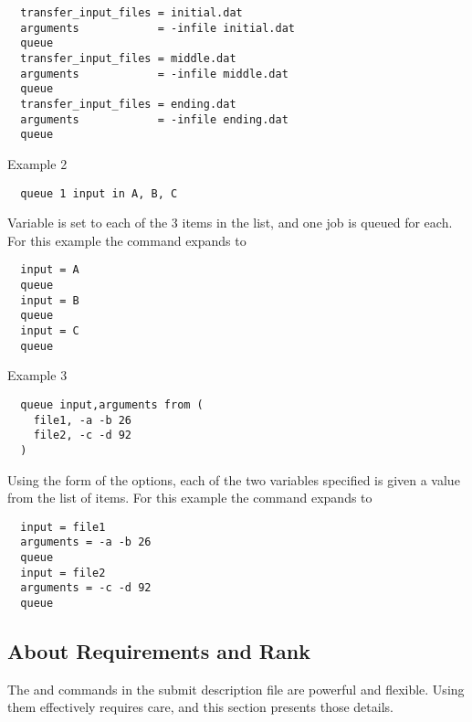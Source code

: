\begin{verbatim}
  transfer_input_files = initial.dat
  arguments            = -infile initial.dat
  queue 
  transfer_input_files = middle.dat
  arguments            = -infile middle.dat
  queue 
  transfer_input_files = ending.dat
  arguments            = -infile ending.dat
  queue 
\end{verbatim}

\begin{description}
\item[Example 2]
\end{description}
\begin{verbatim}
  queue 1 input in A, B, C
\end{verbatim}
Variable  is set to each of the 3 items in the list,
and one job is queued for each.
For this example the  command expands to
\begin{verbatim}
  input = A
  queue 
  input = B
  queue 
  input = C
  queue 
\end{verbatim}

\begin{description}
\item[Example 3]
\end{description}
\begin{verbatim}
  queue input,arguments from (
    file1, -a -b 26
    file2, -c -d 92
  )
\end{verbatim}
Using the  form of the options,
each of the two variables specified is given a value from the list of items.
For this example the  command expands to
\begin{verbatim}
  input = file1
  arguments = -a -b 26
  queue 
  input = file2
  arguments = -c -d 92
  queue 
\end{verbatim}

\subsection{\label{sec:user-man-req-and-rank}About Requirements and Rank}

The 
 and  commands in the submit description file
are powerful and flexible. 
Using them effectively requires care, and this section presents
those details.

